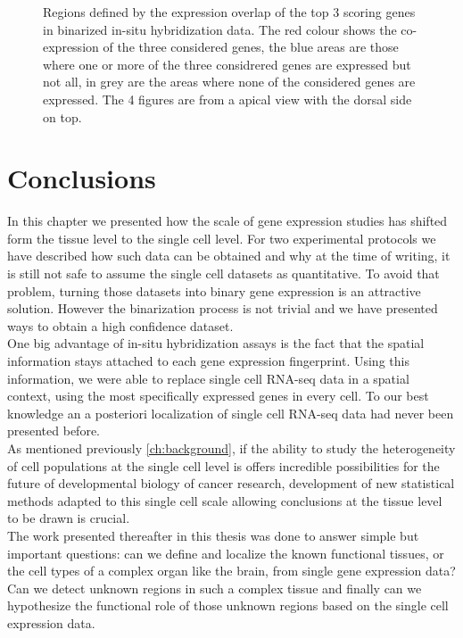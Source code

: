 \begin{figure}[bth]
        \caption{Regions defined by the expression overlap of the top 3 scoring genes in \cite{Tomer10} binarized in-situ hybridization data. The red colour shows the co-expression of the three considered genes, the blue areas are those where one or more of the three considrered genes are expressed but not all, in grey are the areas where none of the considered genes are expressed. The 4 figures are from a apical view with the dorsal side on top.}\label{fig:cell_localization}
\end{figure}


\section{Conclusions}
In this chapter we presented how the scale of gene expression studies has shifted form the tissue level to the single cell level. For two experimental protocols we have described how such data can be obtained and why at the time of writing, it is still not safe to assume the single cell datasets as quantitative. To avoid that problem, turning those datasets into binary gene expression is an attractive solution. However the binarization process is not trivial and we have presented ways to obtain a high confidence dataset.\\

One big advantage of in-situ hybridization assays is the fact that the spatial information stays attached to each gene expression fingerprint. Using this information, we were able to replace single cell RNA-seq data in a spatial context, using the most specifically expressed genes in every cell. To our best knowledge an a posteriori localization of single cell RNA-seq data had never been presented before.\\

As mentioned previously \ref{ch:background}, if the ability to study the heterogeneity of cell populations at the single cell level is offers incredible possibilities for the future of developmental biology of cancer research, development of new statistical methods adapted to this single cell scale allowing conclusions at the tissue level to be drawn is crucial.\\

The work presented thereafter in this thesis was done to answer simple but important questions: can we define and localize the known functional tissues, or the cell types of a complex organ like the brain, from single gene expression data? Can we detect unknown regions in such a complex tissue and finally can we hypothesize the functional role of those unknown regions based on the single cell expression data.


	
	




